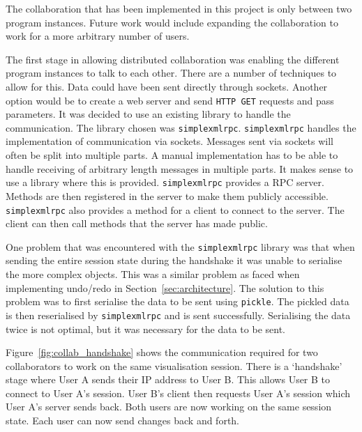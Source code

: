 The collaboration that has been implemented in this project is only between two program instances.  Future work would include expanding the collaboration to work for a more arbitrary number of users.

The first stage in allowing distributed collaboration was enabling the different program instances to talk to each other. There are a number of techniques to allow for this.  Data could have been sent directly through sockets. Another option would be to create a web server and send \texttt{HTTP GET} requests and pass parameters.  It was decided to use an existing library to handle the communication.  The library chosen was \texttt{simplexmlrpc}.  \texttt{simplexmlrpc} handles the implementation of communication via sockets.  Messages sent via sockets will often be split into multiple parts.  A manual implementation has to be able to handle receiving of arbitrary length messages in multiple parts.  It makes sense to use a library where this is provided.  \texttt{simplexmlrpc} provides a \ac{RPC} server.  Methods are then registered in the server to make them publicly accessible.  \texttt{simplexmlrpc} also provides a method for a client to connect to the server.  The client can then call methods that the server has made public.

One problem that was encountered with the \texttt{simplexmlrpc} library was that when sending the entire session state during the handshake it was unable to serialise the more complex objects.  This was a similar problem as faced when implementing undo/redo in Section~\ref{sec:architecture}.  The solution to this problem was to first serialise the data to be sent using \texttt{pickle}.  The pickled data is then reserialised by \texttt{simplexmlrpc} and is sent successfully.  Serialising the data twice is not optimal, but it was necessary for the data to be sent.

Figure~\ref{fig:collab_handshake} shows the communication required for two collaborators to work on the same visualisation session.  There is a `handshake' stage where User A sends their IP address to User B.  This allows User B to connect to User A's session.  User B's client then requests User A's session which User A's server sends back.  Both users are now working on the same session state.  Each user can now send changes back and forth.

